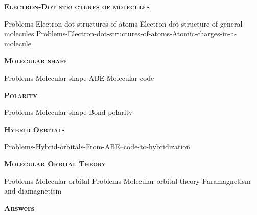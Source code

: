 \documentclass[main.tex]{subfiles}
\newcommand\chapterlabel{Ch-electronicstructure}
\begin{document}
\newpage
\setdoublesep{0.35700 em}  %
\setatomsep{1.78500 em}    %
\setbondoffset{0.18265 em} %
\newcommand{\bondwidth}{0.06642 em} %
\setbondstyle{line width = \bondwidth}
\fancyhfoffset[E,O]{0pt}
\setlength{\columnsep}{30pt}
\begin{conclusion}
\end{conclusion}






\begin{multicols*}{2}\setcounter{numA}{1}  

{\raggedright\textsc{\textbf{Electron-Dot structures of molecules }}\par}
{Problems-Electron-dot-structures-of-atoms-Electron-dot-structure-of-general-molecules}
{Problems-Electron-dot-structures-of-atoms-Atomic-charges-in-a-molecule}
{\raggedright\textsc{\textbf{Molecular shape}}\par}
{Problems-Molecular-shape-ABE-Molecular-code}


{\raggedright\textsc{\textbf{Polarity}}\par}
{Problems-Molecular-shape-Bond-polarity}
{\raggedright\textsc{\textbf{Hybrid Orbitals}}\par}
{Problems-Hybrid-orbitals-From-ABE--code-to-hybridization}
{\raggedright\textsc{\textbf{Molecular Orbital Theory}}\par}
{Problems-Molecular-orbital}
{Problems-Molecular-orbital-theory-Paramagnetism-and-diamagnetism}


 
\end{multicols*}
\newpage
\begin{answersenvironment}
\begin{minipage}[c]{1\textwidth}
\begin{localsize}{10}
{\Large \bf Answers}
\printsolutions 
\end{localsize}
\end{minipage}\end{answersenvironment}
\end{document}
